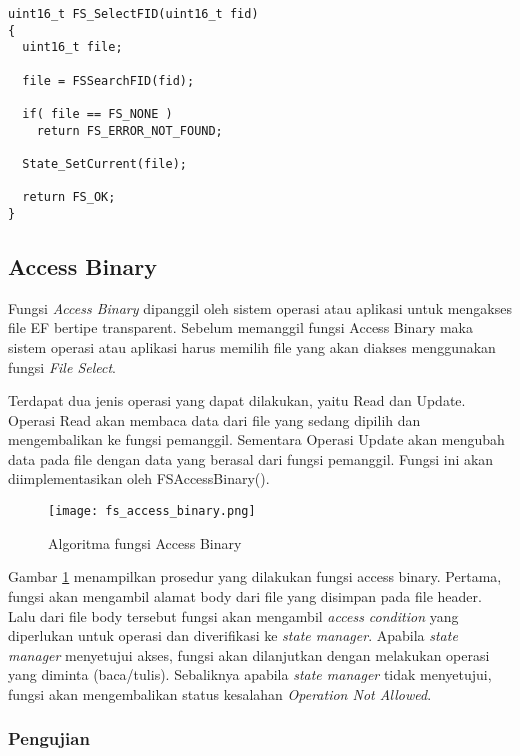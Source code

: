 \begin{lstlisting}[caption={Listing Program Fungsi FS Select File}, label={list-selectfile}]
uint16_t FS_SelectFID(uint16_t fid)
{
  uint16_t file;

  file = FSSearchFID(fid);

  if( file == FS_NONE )
    return FS_ERROR_NOT_FOUND;

  State_SetCurrent(file);

  return FS_OK;
}
\end{lstlisting}

\subsection{Access Binary}

Fungsi {\em Access Binary} dipanggil oleh sistem operasi atau aplikasi untuk mengakses file EF bertipe transparent. Sebelum memanggil fungsi Access Binary maka sistem operasi atau aplikasi harus memilih file yang akan diakses menggunakan fungsi {\em File Select}. 

Terdapat dua jenis operasi yang dapat dilakukan, yaitu Read dan Update. Operasi Read akan membaca data dari file yang sedang dipilih dan mengembalikan ke fungsi pemanggil. Sementara Operasi Update akan mengubah data pada file dengan data yang berasal dari fungsi pemanggil. Fungsi ini akan diimplementasikan oleh FSAccessBinary().

\begin{figure}
\centering
\texttt{[image: fs\_access\_binary.png]}
\caption{Algoritma fungsi Access Binary}
\label{fig-access-binary}
\end{figure}

Gambar \ref{fig-access-binary} menampilkan prosedur yang dilakukan fungsi access binary. Pertama, fungsi akan mengambil alamat body dari file yang disimpan pada file header. Lalu dari file body tersebut fungsi akan mengambil {\em access condition} yang diperlukan untuk operasi dan diverifikasi ke {\em state manager}. Apabila {\em state manager} menyetujui akses, fungsi akan dilanjutkan dengan melakukan operasi yang diminta (baca/tulis). Sebaliknya apabila {\em state manager} tidak menyetujui, fungsi akan mengembalikan status kesalahan {\em Operation Not Allowed}.

\subsubsection{Pengujian}

